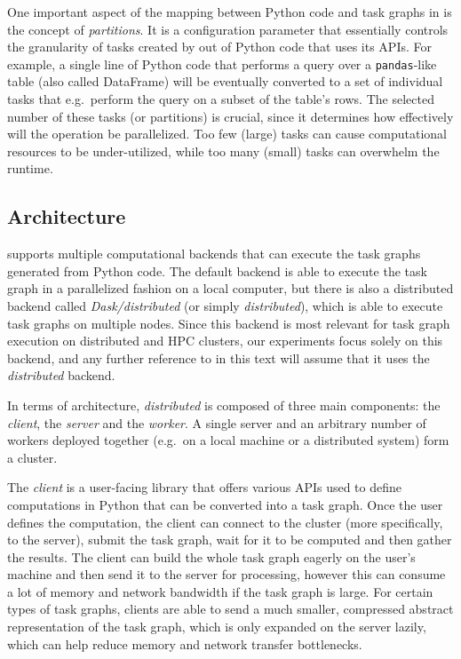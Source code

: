 One important aspect of the mapping between Python code and task graphs in \dask{}
is the concept of \emph{partitions}. It is a configuration parameter that essentially controls
the granularity of tasks created by \dask{} out of Python code that uses its APIs.
For example, a single line of Python code that performs a query over a \texttt{pandas}-like
table (also called DataFrame) will be eventually converted to a set of individual tasks that e.g.\
perform the query on a subset of the table's rows. The selected number of these tasks (or
partitions) is crucial, since it determines how effectively will the operation be parallelized. Too
few (large) tasks can cause computational resources to be under-utilized, while too many (small)
tasks can overwhelm the \dask{} runtime.

\subsection*{Architecture}
\dask{} supports multiple computational backends that can execute the task graphs
generated from Python code. The default backend is able to execute the task graph in a parallelized
fashion on a local computer, but there is also a distributed backend called
\emph{Dask/distributed}\footnoteurl{https://distributed.dask.org}
(or simply \emph{distributed}), which is able to execute task graphs on multiple
nodes. Since this backend is most relevant for task graph execution on distributed and HPC
clusters, our experiments focus solely on this backend, and any further reference to
\dask{} in this text will assume that it uses the \emph{distributed} backend.

In terms of architecture, \emph{distributed} is composed of three main components: the
\emph{client}, the \emph{server} and the \emph{worker}. A single
server and an arbitrary number of workers deployed together (e.g.\ on a local machine or a
distributed system) form a \dask{} cluster.

The \emph{client} is a user-facing library that offers various APIs used to define
computations in Python that can be converted into a task graph. Once the user defines the
computation, the client can connect to the \dask{} cluster (more specifically, to
the server), submit the task graph, wait for it to be computed and then gather the results. The
client can build the whole task graph eagerly on the user's machine and then send it to the server
for processing, however this can consume a lot of memory and network bandwidth if the task graph is
large. For certain types of task graphs, clients are able to send a much smaller, compressed
abstract representation of the task graph, which is only expanded on the server lazily, which can
help reduce memory and network transfer bottlenecks.

